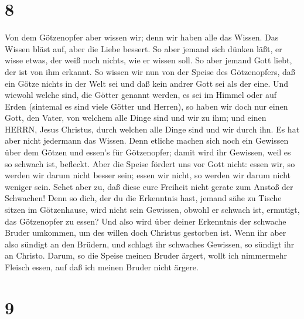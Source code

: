 \hypertarget{section-7}{%
\section{8}\label{section-7}}

 Von dem Götzenopfer aber wissen wir; denn wir haben alle
das Wissen. Das Wissen bläst auf, aber die Liebe bessert. 
So aber jemand sich dünken läßt, er wisse etwas, der weiß noch nichts,
wie er wissen soll.  So aber jemand Gott liebt, der ist von
ihm erkannt.  So wissen wir nun von der Speise des
Götzenopfers, daß ein Götze nichts in der Welt sei und daß kein andrer
Gott sei als der eine.  Und wiewohl welche sind, die Götter
genannt werden, es sei im Himmel oder auf Erden (sintemal es sind viele
Götter und Herren),  so haben wir doch nur einen Gott, den
Vater, von welchem alle Dinge sind und wir zu ihm; und einen HERRN,
Jesus Christus, durch welchen alle Dinge sind und wir durch ihn.
 Es hat aber nicht jedermann das Wissen. Denn etliche machen
sich noch ein Gewissen über dem Götzen und essen's für Götzenopfer;
damit wird ihr Gewissen, weil es so schwach ist, befleckt. 
Aber die Speise fördert uns vor Gott nicht: essen wir, so werden wir
darum nicht besser sein; essen wir nicht, so werden wir darum nicht
weniger sein.  Sehet aber zu, daß diese eure Freiheit nicht
gerate zum Anstoß der Schwachen!  Denn so dich, der du die
Erkenntnis hast, jemand sähe zu Tische sitzen im Götzenhause, wird nicht
sein Gewissen, obwohl er schwach ist, ermutigt, das Götzenopfer zu
essen?  Und also wird über deiner Erkenntnis der schwache
Bruder umkommen, um des willen doch Christus gestorben ist.
 Wenn ihr aber also sündigt an den Brüdern, und schlagt ihr
schwaches Gewissen, so sündigt ihr an Christo.  Darum, so
die Speise meinen Bruder ärgert, wollt ich nimmermehr Fleisch essen, auf
daß ich meinen Bruder nicht ärgere.

\hypertarget{section-8}{%
\section{9}\label{section-8}}

